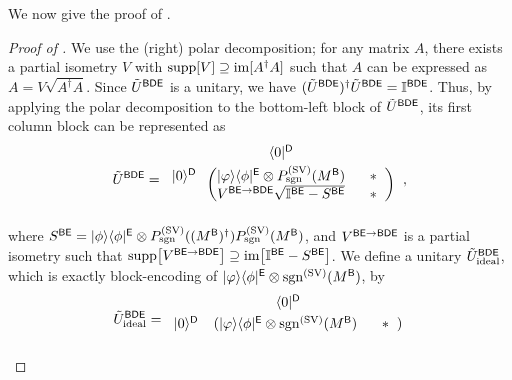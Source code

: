 We now give the proof of .
\begin{proof}[Proof of ]

We use the (right) polar decomposition; for any matrix $A$, there exists a partial isometry $V$ with $\mathrm{supp}[V] \supseteq \mathrm{im}[A^\dag A]$ such that $A$ can be expressed as $A = V\sqrt{A^\dag A}$.
Since $\tilde{U}^{{\mathsf{B}}{\mathsf{D}}{\mathsf{E}}}$ is a unitary, we have $(\tilde{U}^{{\mathsf{B}}{\mathsf{D}}{\mathsf{E}}})^\dag \tilde{U}^{{\mathsf{B}}{\mathsf{D}}{\mathsf{E}}} = \mathbb{I}^{{\mathsf{B}}{\mathsf{D}}{\mathsf{E}}}$.
Thus, by applying the polar decomposition to the bottom-left block of $\tilde{U}^{{\mathsf{B}}{\mathsf{D}}{\mathsf{E}}}$, its first column block can be represented as
\begin{align}
\til{U}^{\sB\sD\sE} =
\begin{blockarray}{ccc}
& \bra{0}^{\sD}&  \vspace{1mm}\\
\begin{block}{c(cc)} 
  \ket{0}^{\sD}\hspace*{1mm} &  \ketbra{\varphi}{\phi}^\sE\otimes P_\sgn^{(\rm SV)}(M^\sB) & \hspace*{2mm} * \hspace*{2mm}\\ 
  &  V^{\sB\sE \rarr \sB\sD\sE}\sqrt{\bI^{\sB\sE} - S^{\sB\sE}} &\hspace*{2mm} * \hspace*{2mm}\\
\end{block}
\end{blockarray}\hspace{2.5mm},
\end{align}
where $S^{{\mathsf{B}}{\mathsf{E}}} = |\phi\rangle\langle\phi|^{\mathsf{E}} \otimes P_{\mathrm{sgn}}^{(\rm SV)}((M^{\mathsf{B}})^\dag)P_{\mathrm{sgn}}^{(\rm SV)}(M^{\mathsf{B}})$, and $V^{{\mathsf{B}}{\mathsf{E}} \rightarrow {\mathsf{B}}{\mathsf{D}}{\mathsf{E}}}$ is a partial isometry such that $\mathrm{supp}\big[V^{{\mathsf{B}}{\mathsf{E}}\rightarrow{\mathsf{B}}{\mathsf{D}}{\mathsf{E}}}\big] \supseteq \mathrm{im}\big[\mathbb{I}^{{\mathsf{B}}{\mathsf{E}}} - S^{{\mathsf{B}}{\mathsf{E}}}\big]$.
We define a unitary $\tilde{U}_{\rm ideal}^{{\mathsf{B}}{\mathsf{D}}{\mathsf{E}}}$, which is exactly block-encoding of $|\varphi\rangle\langle\phi|^{\mathsf{E}} \otimes \mathrm{sgn}^{(\rm SV)}(M^{\mathsf{B}})$, by
\begin{align}
\til{U}_{\rm ideal}^{\sB\sD\sE} = 
\begin{blockarray}{ccc}
& \bra{0}^{\sD}&  \vspace{1mm}\\
\begin{block}{c(cc)} 
  \ket{0}^{\sD}\hspace*{1mm} &  \ketbra{\varphi}{\phi}^\sE\otimes\sgn^{(\rm SV)}(M^\sB) & \hspace*{2mm} * \hspace*{2mm}\\

\end{block}
\end{blockarray}
\end{align}
\end{proof}
